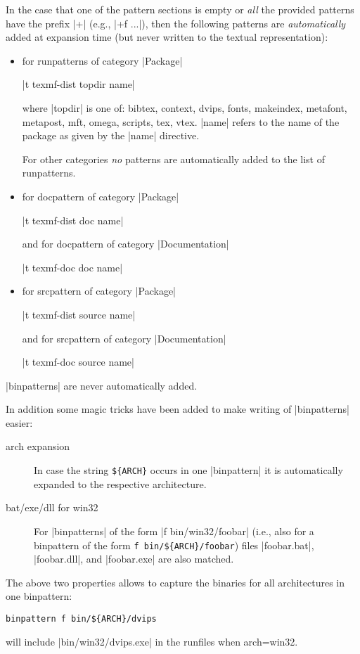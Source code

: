 \documentclass{arstexnica}
\begin{document}
\begin{article}
In the case that one of the pattern sections is empty or \emph{all}
the provided patterns have the prefix |+| (e.g., |+f ...|), then the
following patterns are \emph{automatically} added at expansion time
(but never written to the textual representation):

\begin{itemize}
\item for runpatterns of category |Package|
  \begin{center}
    |t texmf-dist topdir name|
  \end{center}
  where |topdir| is one of: bibtex, context, dvips, fonts, makeindex,
  metafont, metapost, mft, omega, scripts, tex, vtex. |name| refers to
  the name of the package as given by the |name| directive.

  For other categories \emph{no} patterns are automatically added to
  the list of runpatterns.
\item for docpattern of category |Package|
  \begin{center}
    |t texmf-dist doc name|
  \end{center}
  and for docpattern of category |Documentation|
  \begin{center}
    |t texmf-doc doc name|
  \end{center}
\item for srcpattern of category |Package|
  \begin{center}
    |t texmf-dist source name|
  \end{center}
  and for srcpattern of category |Documentation|
  \begin{center}
    |t texmf-doc source name|
  \end{center}
\end{itemize}
|binpatterns| are never automatically added.

In addition some magic tricks have been added to make writing of
|binpatterns| easier:
\begin{description}
\item[arch expansion]
  In case the string \verb+${ARCH}+ occurs in one |binpattern| it is 
  automatically expanded to the respective architecture.
\item[bat/exe/dll for win32]
  For |binpatterns| of the form |f bin/win32/foobar| (i.e., also for a
  binpattern of the form \verb+f bin/${ARCH}/foobar+) files
  |foobar.bat|, |foobar.dll|, and |foobar.exe| are also matched.
\end{description}
The above two properties allows to capture the binaries for all
architectures in one binpattern:
\begin{center}
        \verb+binpattern f bin/${ARCH}/dvips+
\end{center}
will include |bin/win32/dvips.exe| in the runfiles when arch=win32. 


\end{article}
\end{document}
